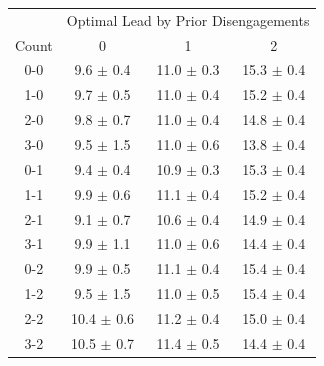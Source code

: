 \begin{tabular}{c|ccc}
& \multicolumn{3}{c}{Optimal Lead by Prior Disengagements}\\
Count & 0 & 1 & 2 \\
  \hline
0-0 & 9.6 {\color{gray} $\pm$ 0.4} & 11.0 {\color{gray} $\pm$ 0.3} & 15.3 {\color{gray} $\pm$ 0.4} \\ 
  1-0 & 9.7 {\color{gray} $\pm$ 0.5} & 11.0 {\color{gray} $\pm$ 0.4} & 15.2 {\color{gray} $\pm$ 0.4} \\ 
  2-0 & 9.8 {\color{gray} $\pm$ 0.7} & 11.0 {\color{gray} $\pm$ 0.4} & 14.8 {\color{gray} $\pm$ 0.4} \\ 
  3-0 & 9.5 {\color{gray} $\pm$ 1.5} & 11.0 {\color{gray} $\pm$ 0.6} & 13.8 {\color{gray} $\pm$ 0.4} \\ 
   \hline
0-1 & 9.4 {\color{gray} $\pm$ 0.4} & 10.9 {\color{gray} $\pm$ 0.3} & 15.3 {\color{gray} $\pm$ 0.4} \\ 
  1-1 & 9.9 {\color{gray} $\pm$ 0.6} & 11.1 {\color{gray} $\pm$ 0.4} & 15.2 {\color{gray} $\pm$ 0.4} \\ 
  2-1 & 9.1 {\color{gray} $\pm$ 0.7} & 10.6 {\color{gray} $\pm$ 0.4} & 14.9 {\color{gray} $\pm$ 0.4} \\ 
  3-1 & 9.9 {\color{gray} $\pm$ 1.1} & 11.0 {\color{gray} $\pm$ 0.6} & 14.4 {\color{gray} $\pm$ 0.4} \\ 
   \hline
0-2 & 9.9 {\color{gray} $\pm$ 0.5} & 11.1 {\color{gray} $\pm$ 0.4} & 15.4 {\color{gray} $\pm$ 0.4} \\ 
  1-2 & 9.5 {\color{gray} $\pm$ 1.5} & 11.0 {\color{gray} $\pm$ 0.5} & 15.4 {\color{gray} $\pm$ 0.4} \\ 
  2-2 & 10.4 {\color{gray} $\pm$ 0.6} & 11.2 {\color{gray} $\pm$ 0.4} & 15.0 {\color{gray} $\pm$ 0.4} \\ 
  3-2 & 10.5 {\color{gray} $\pm$ 0.7} & 11.4 {\color{gray} $\pm$ 0.5} & 14.4 {\color{gray} $\pm$ 0.4} \\ 
\end{tabular}
